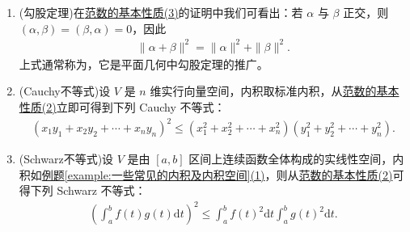 \documentclass[../../main.tex]{subfiles}
\begin{document}
\begin{corollary}\label{corollary:范数性质的相关推广}
\begin{enumerate}
\item\label{corollary:范数性质的相关推广-勾股定理} (勾股定理)在\hyperref[theorem:范数的基本性质]{范数的基本性质(3)}的证明中我们可看出：若 \(\alpha\) 与 \(\beta\) 正交，则 \((\alpha,\beta)=(\beta,\alpha)=0\)，因此
\begin{align*}
\|\alpha + \beta\|^2=\|\alpha\|^2+\|\beta\|^2.
\end{align*}
上式通常称为，它是平面几何中勾股定理的推广。

\item\label{corollary:范数性质的相关推广-Cauchy不等式} (Cauchy不等式)设 \(V\) 是 \(n\) 维实行向量空间，内积取标准内积，从\hyperref[theorem:范数的基本性质]{范数的基本性质(2)}立即可得到下列 Cauchy 不等式：
\begin{align*}
(x_1y_1 + x_2y_2+\cdots + x_ny_n)^2\leqslant (x_1^2 + x_2^2+\cdots + x_n^2)(y_1^2 + y_2^2+\cdots + y_n^2).
\end{align*}

\item\label{corollary:范数性质的相关推广-Schwarz不等式} (Schwarz不等式)设 \(V\) 是由 \([a,b]\) 区间上连续函数全体构成的实线性空间，内积如\hyperref[example:一些常见的内积及内积空间]{例题\ref{example:一些常见的内积及内积空间}(1)}，则从\hyperref[theorem:范数的基本性质]{范数的基本性质(2)}可得下列 Schwarz 不等式：
\begin{align*}
\left(\int_{a}^{b}f(t)g(t)\mathrm{d}t\right)^2\leqslant \int_{a}^{b}f(t)^2\mathrm{d}t\int_{a}^{b}g(t)^2\mathrm{d}t.
\end{align*} 
\end{enumerate}
\end{corollary}
\end{document}
